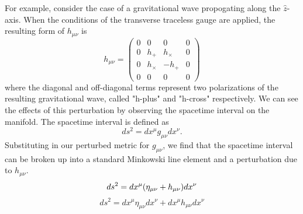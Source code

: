For example, consider the case of a gravitational 
wave propogating along the $\hat{z}$-axis.
When the conditions of the transverse traceless gauge are applied, 
the resulting form of $h_{\mu\nu}$ is 
\begin{equation}
h_{\mu\nu} = 
  \begin{pmatrix}
    0 & 0 & 0 & 0 \\
    0 & h_+ & h_\times & 0 \\
    0 & h_\times & -h_+ & 0 \\
    0 & 0 & 0 & 0
  \end{pmatrix}
\label{eq:strain}
\end{equation}
where the diagonal and off-diagonal terms represent two polarizations 
of the resulting gravitational wave, called "h-plus" and "h-cross" 
respectively.
We can see the effects of this perturbation by observing the  
spacetime interval on the manifold. The spacetime interval is defined as 
\begin{equation}
ds^2 = dx^\mu g_{\mu\nu}dx^\nu.
\end{equation}
Substituting in our perturbed metric for $g_{\mu\nu}$, we find that 
the spacetime interval can be broken up into a standard Minkowski line 
element and a perturbation due to $h_{\mu\nu}$.
\begin{equation}
ds^2 = dx^\mu (\eta_{\mu\nu} + h_{\mu\nu})dx^\nu \\
\end{equation}
\begin{equation}
ds^2 = dx^\mu \eta_{\mu\nu} dx^\nu + dx^\mu h_{\mu\nu}dx^\nu
\label{eq:spacetime}
\end{equation}

